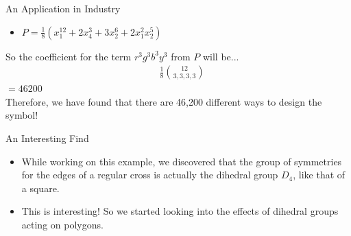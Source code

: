 \documentclass{beamer}
\begin{document}
\begin{frame}{An Application in Industry}
\begin{itemize}
\item $P = \frac{1}{8}(x_1^{12}+2x_4^3 +3x_2^6 +2x_1^2 x_2^5)$
\end{itemize}
So the coefficient for the term $r^3g^3b^3y^3$ from $P$ will be...\\
\begin{align*}
&\frac{1}{8}{{12}\choose{3,3,3,3}}
\end{align*}
$=46200$\\
\vspace{40pt}
Therefore, we have found that there are 46,200 different ways to design the symbol!
\end{frame}

\begin{frame}{An Interesting Find}
\begin{itemize}
\item While working on this example, we discovered that the group of symmetries for the edges of a regular cross is actually the dihedral group $D_4$, like that of a square.
\item This is interesting! So we started looking into the effects of dihedral groups acting on polygons.
\end{itemize}
\end{frame}


\end{document}
